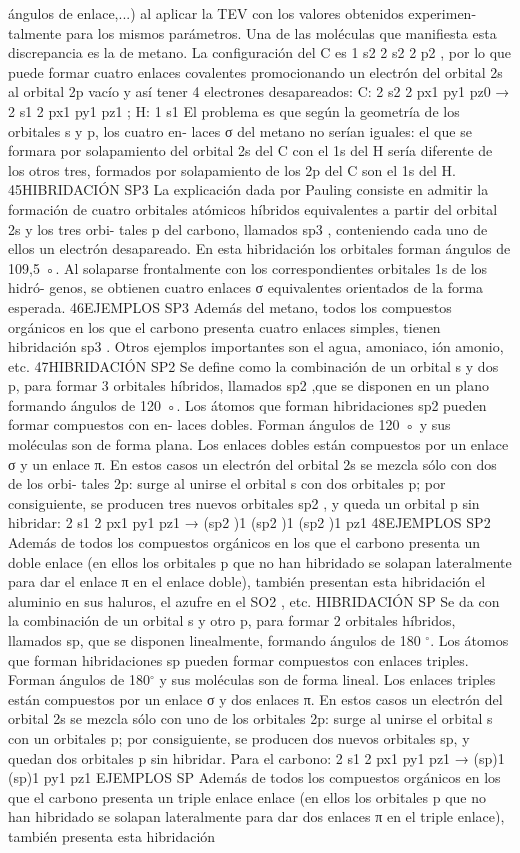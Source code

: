 \documentclass[tikz,border=2mm]{standalone}
\begin{document}
ángulos de enlace,...) al aplicar la TEV con los valores obtenidos experimen- talmente para los mismos parámetros. Una de las moléculas que manifiesta esta discrepancia es la de metano. La configuración del C es 1 s2 2 s2 2 p2 , por lo que puede formar cuatro enlaces covalentes promocionando un electrón del orbital 2s al orbital 2p vacío y así tener 4 electrones desapareados: C: 2 s2 2 px1 py1 pz0 → 2 s1 2 px1 py1 pz1 ; H: 1 s1 El problema es que según la geometría de los orbitales s y p, los cuatro en- laces σ del metano no serían iguales: el que se formara por solapamiento del orbital 2s del C con el 1s del H sería diferente de los otros tres, formados por solapamiento de los 2p del C son el 1s del H. 45HIBRIDACIÓN SP3 La explicación dada por Pauling consiste en admitir la formación de cuatro orbitales atómicos híbridos equivalentes a partir del orbital 2s y los tres orbi- tales p del carbono, llamados sp3 , conteniendo cada uno de ellos un electrón desapareado. En esta hibridación los orbitales forman ángulos de 109,5 ◦. Al solaparse frontalmente con los correspondientes orbitales 1s de los hidró- genos, se obtienen cuatro enlaces σ equivalentes orientados de la forma esperada. 46EJEMPLOS SP3 Además del metano, todos los compuestos orgánicos en los que el carbono presenta cuatro enlaces simples, tienen hibridación sp3 . Otros ejemplos importantes son el agua, amoniaco, ión amonio, etc. 47HIBRIDACIÓN SP2 Se define como la combinación de un orbital s y dos p, para formar 3 orbitales híbridos, llamados sp2 ,que se disponen en un plano formando ángulos de 120 ◦. Los átomos que forman hibridaciones sp2 pueden formar compuestos con en- laces dobles. Forman ángulos de 120 ◦ y sus moléculas son de forma plana. Los enlaces dobles están compuestos por un enlace σ y un enlace π. En estos casos un electrón del orbital 2s se mezcla sólo con dos de los orbi- tales 2p: surge al unirse el orbital s con dos orbitales p; por consiguiente, se producen tres nuevos orbitales sp2 , y queda un orbital p sin hibridar: 2 s1 2 px1 py1 pz1 → (sp2 )1 (sp2 )1 (sp2 )1 pz1 48EJEMPLOS SP2 Además de todos los compuestos orgánicos en los que el carbono presenta un doble enlace (en ellos los orbitales p que no han hibridado se solapan lateralmente para dar el enlace π en el enlace doble), también presentan esta hibridación el aluminio en sus haluros, el azufre en el SO2 , etc. HIBRIDACIÓN SP Se da con la combinación de un orbital s y otro p, para formar 2 orbitales híbridos, llamados sp, que se disponen linealmente, formando ángulos de 180 $^{\circ}$. Los átomos que forman hibridaciones sp pueden formar compuestos con enlaces triples. Forman ángulos de 180$^{\circ}$ y sus moléculas son de forma lineal. Los enlaces triples están compuestos por un enlace σ y dos enlaces π. En estos casos un electrón del orbital 2s se mezcla sólo con uno de los orbitales 2p: surge al unirse el orbital s con un orbitales p; por consiguiente, se producen dos nuevos orbitales sp, y quedan dos orbitales p sin hibridar. Para el carbono: 2 s1 2 px1 py1 pz1 → (sp)1 (sp)1 py1 pz1 EJEMPLOS SP Además de todos los compuestos orgánicos en los que el carbono presenta un triple enlace enlace (en ellos los orbitales p que no han hibridado se solapan lateralmente para dar dos enlaces π en el triple enlace), también presenta esta hibridación 
\end{document}
